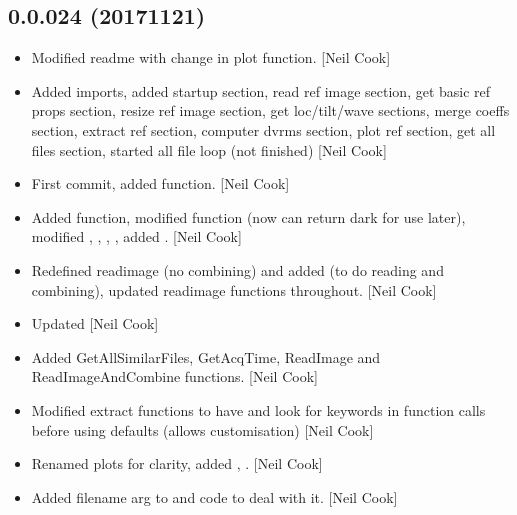 \documentclass[a4paper,10pt,english]{report}
\begin{document}
\subsection{0.0.024 (2017\sphinxhyphen{}11\sphinxhyphen{}21)}
\label{\detokenize{misc/changelog:id547}}\begin{itemize}
\item {} 
Modified readme with change in plot function. {[}Neil Cook{]}

\item {} 
Added imports, added startup section, read ref image section, get
basic ref props section, resize ref image section, get loc/tilt/wave
sections, merge coeffs section, extract ref section, computer dvrms
section, plot ref section, get all files section, started all file
loop (not finished) {[}Neil Cook{]}

\item {} 
First commit, added  function. {[}Neil Cook{]}

\item {} 
Added  function, modified 
function (now can return dark for use later), modified ,
, , , added . {[}Neil Cook{]}

\item {} 
Redefined readimage (no combining) and added  (to
do reading and combining), updated readimage functions throughout.
{[}Neil Cook{]}

\item {} 
Updated  {[}Neil Cook{]}

\item {} 
Added GetAllSimilarFiles, GetAcqTime, ReadImage and
ReadImageAndCombine functions. {[}Neil Cook{]}

\item {} 
Modified extract functions to have and look for keywords in function
calls before using defaults (allows customisation) {[}Neil Cook{]}

\item {} 
Renamed plots for clarity, added ,
. {[}Neil Cook{]}

\item {} 
Added filename arg to  and code to deal with it.
{[}Neil Cook{]}


\end{itemize}
\end{document}
